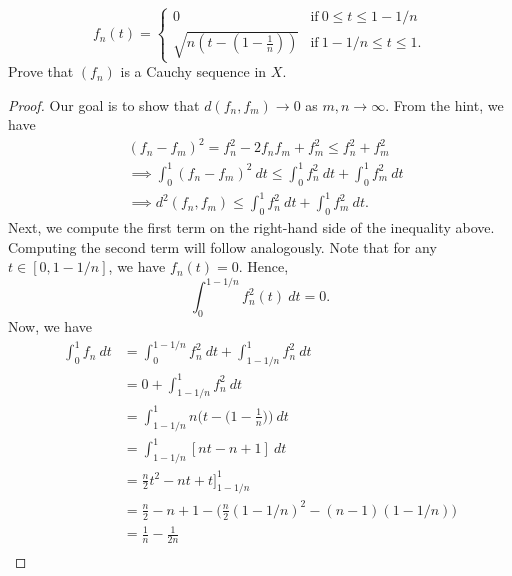 \documentclass[a4paper]{article}
\begin{document}
\begin{enumerate}
        \[  {f}_{n}(t) = 
        \begin{cases}
            0 &\text{if} \ 0 \leq t \leq 1 - 1/n \\
            \sqrt{ n (t - (1 - \frac{ 1 }{ n } )) }  &\text{if} \ 1 - 1 /n \leq t \leq 1.
        \end{cases} \]
        Prove that \( ({f}_{n}) \) is a Cauchy sequence in \( X  \). 
        \begin{proof}
        Our goal is to show that \( d({f}_{n}, {f}_{m}) \to 0  \) as \( m,n \to \infty   \). From the hint, we have  
        \begin{align*}
            &({f}_{n} - {f}_{m})^{2} = {f}_{n}^{2} - 2 {f}_{n} {f}_{m} + {f}_{m}^{2} \leq {f}_{n}^{2} + {f}_{m}^{2} \\
                                    &\implies \int_{ 0 }^{ 1 } ({f}_{n} - {f}_{m})^{2} \ dt \leq \int_{ 0 }^{ 1 }  {f}_{n}^{2}  \ dt + \int_{ 0 }^{ 1 }  {f}_{m}^{2} \ dt \\
                                    &\implies d^{2}({f}_{n}, {f}_{m}) \leq \int_{ 0 }^{ 1 } {f}_{n}^{2}  \ d t + \int_{ 0 }^{ 1 }  {f}_{m}^{2} \ dt. 
    \end{align*}
    Next, we compute the first term on the right-hand side of the inequality above. Computing the second term will follow analogously. Note that for any \( t \in [0, 1 - 1/n] \), we have \( {f}_{n}(t) = 0  \). Hence, 
    \[  \int_{ 0 }^{ 1- 1/n }  {f}_{n}^{2}(t) \ dt = 0.  \]
    Now, we have 
    \begin{align*}
        \int_{ 0 }^{ 1 }  {f}_{n} \ dt &= \int_{ 0 }^{ 1 - 1/n }  {f}_{n}^{2} \ dt + \int_{ 1 - 1/n }^{  1  } {f}_{n}^{2}  \ dt  \\
                                       &= 0 + \int_{ 1 - 1/n }^{ 1  }  {f}_{n}^{2} \ dt \\
                                       &= \int_{ 1 - 1/n }^{ 1  } n \Bigg(  t - \Big( 1 - \frac{ 1 }{ n }  \Big)  \Bigg) \ dt \\
                                       &= \int_{ 1 - 1/n }^{ 1  }  [ nt - n  + 1] \ dt \\
                                       &= \frac{ n }{ 2 }  t^{2} - nt + t \Big]_{1- 1/n}^{1} \\
                                       &= \frac{ n }{ 2 }  - n + 1 - \Big(  \frac{ n }{ 2 }  (1 - 1/n)^{2} - (n-1) (1 - 1/n) \Big) \\
                                       &= \frac{ 1 }{ n }  - \frac{ 1 }{ 2n }  \\

\end{align*}
\end{proof}
\end{enumerate}
\end{document}
